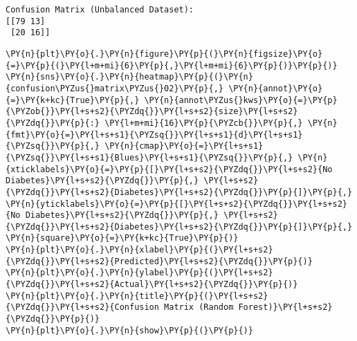     \begin{Verbatim}[commandchars=\\\{\}]
Confusion Matrix (Unbalanced Dataset):
[[79 13]
 [20 16]]
    \end{Verbatim}

    \begin{tcolorbox}[breakable, size=fbox, boxrule=1pt, pad at break*=1mm,colback=cellbackground, colframe=cellborder]
\begin{Verbatim}[commandchars=\\\{\}]
\PY{n}{plt}\PY{o}{.}\PY{n}{figure}\PY{p}{(}\PY{n}{figsize}\PY{o}{=}\PY{p}{(}\PY{l+m+mi}{6}\PY{p}{,}\PY{l+m+mi}{6}\PY{p}{)}\PY{p}{)}
\PY{n}{sns}\PY{o}{.}\PY{n}{heatmap}\PY{p}{(}\PY{n}{confusion\PYZus{}matrix\PYZus{}02}\PY{p}{,} \PY{n}{annot}\PY{o}{=}\PY{k+kc}{True}\PY{p}{,} \PY{n}{annot\PYZus{}kws}\PY{o}{=}\PY{p}{\PYZob{}}\PY{l+s+s2}{\PYZdq{}}\PY{l+s+s2}{size}\PY{l+s+s2}{\PYZdq{}}\PY{p}{:} \PY{l+m+mi}{16}\PY{p}{\PYZcb{}}\PY{p}{,} \PY{n}{fmt}\PY{o}{=}\PY{l+s+s1}{\PYZsq{}}\PY{l+s+s1}{d}\PY{l+s+s1}{\PYZsq{}}\PY{p}{,} \PY{n}{cmap}\PY{o}{=}\PY{l+s+s1}{\PYZsq{}}\PY{l+s+s1}{Blues}\PY{l+s+s1}{\PYZsq{}}\PY{p}{,} \PY{n}{xticklabels}\PY{o}{=}\PY{p}{[}\PY{l+s+s2}{\PYZdq{}}\PY{l+s+s2}{No Diabetes}\PY{l+s+s2}{\PYZdq{}}\PY{p}{,} \PY{l+s+s2}{\PYZdq{}}\PY{l+s+s2}{Diabetes}\PY{l+s+s2}{\PYZdq{}}\PY{p}{]}\PY{p}{,} \PY{n}{yticklabels}\PY{o}{=}\PY{p}{[}\PY{l+s+s2}{\PYZdq{}}\PY{l+s+s2}{No Diabetes}\PY{l+s+s2}{\PYZdq{}}\PY{p}{,} \PY{l+s+s2}{\PYZdq{}}\PY{l+s+s2}{Diabetes}\PY{l+s+s2}{\PYZdq{}}\PY{p}{]}\PY{p}{,} \PY{n}{square}\PY{o}{=}\PY{k+kc}{True}\PY{p}{)}
\PY{n}{plt}\PY{o}{.}\PY{n}{xlabel}\PY{p}{(}\PY{l+s+s2}{\PYZdq{}}\PY{l+s+s2}{Predicted}\PY{l+s+s2}{\PYZdq{}}\PY{p}{)}
\PY{n}{plt}\PY{o}{.}\PY{n}{ylabel}\PY{p}{(}\PY{l+s+s2}{\PYZdq{}}\PY{l+s+s2}{Actual}\PY{l+s+s2}{\PYZdq{}}\PY{p}{)}
\PY{n}{plt}\PY{o}{.}\PY{n}{title}\PY{p}{(}\PY{l+s+s2}{\PYZdq{}}\PY{l+s+s2}{Confusion Matrix (Random Forest)}\PY{l+s+s2}{\PYZdq{}}\PY{p}{)}
\PY{n}{plt}\PY{o}{.}\PY{n}{show}\PY{p}{(}\PY{p}{)}
\end{Verbatim}
\end{tcolorbox}

    \begin{center}
    \end{center}
    { \hspace*{\fill} \\}
    
